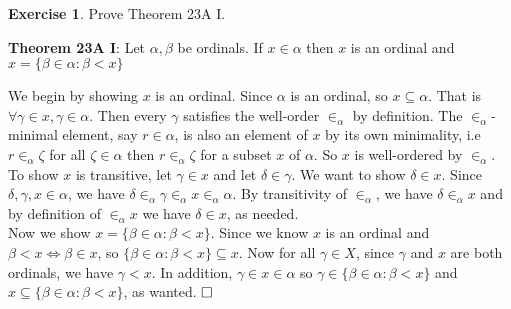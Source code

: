 \documentclass{article}
\theoremstyle{definition}
\newtheorem{exercise}{Exercise}[section]
\newcommand{\so}{\text{\textbf{Solution: }}}
\newcommand{\es}{$\hfill \square$}
\begin{document}
    \begin{exercise}
        Prove Theorem 23A I.
        \begin{center}
            \textbf{Theorem 23A I}: Let $\alpha, \beta$ be ordinals. If $x \in \alpha$ then $x$ is an ordinal and $x = \{\beta \in \alpha : \beta < x\}$
        \end{center}
        \so We begin by showing $x$ is an ordinal. Since $\alpha$ is an ordinal, so $x\subseteq \alpha$. That is $\forall \gamma \in x, \gamma \in \alpha$. Then every $\gamma$ satisfies the well-order $\in_\alpha$ by definition. The $\in_\alpha$-minimal element, say $r \in \alpha$, is also an element of $x$ by its own minimality, i.e $r \in_\alpha \zeta$ for all $\zeta \in \alpha$ then $r \in_\alpha \zeta$ for a subset $x$ of $\alpha$. So $x$ is well-ordered by $\in_\alpha$. To show $x$ is transitive, let $\gamma \in x$ and let $\delta \in \gamma$. We want to show $\delta \in x$. Since $\delta, \gamma, x \in \alpha$, we have $\delta \in_\alpha \gamma \in_\alpha x \in_\alpha \alpha$. By transitivity of $\in_\alpha$, we have $\delta \in_\alpha x$ and by definition of $\in_\alpha x$ we have $\delta \in x$, as needed.\vspace{1em}\\
        Now we show $x = \{\beta \in \alpha : \beta < x\}$. Since we know $x$ is an ordinal and $\beta < x \iff \beta \in x$, so $\{\beta \in \alpha : \beta < x\} \subseteq x$. Now for all $\gamma \in X$, since $\gamma$ and $x$ are both ordinals, we have $\gamma < x$. In addition, $\gamma \in x \in \alpha$ so $\gamma \in \{\beta \in \alpha : \beta < x\}$ and $x \subseteq \{\beta \in \alpha : \beta < x\}$, as wanted. \es
    \end{exercise}
\end{document}
